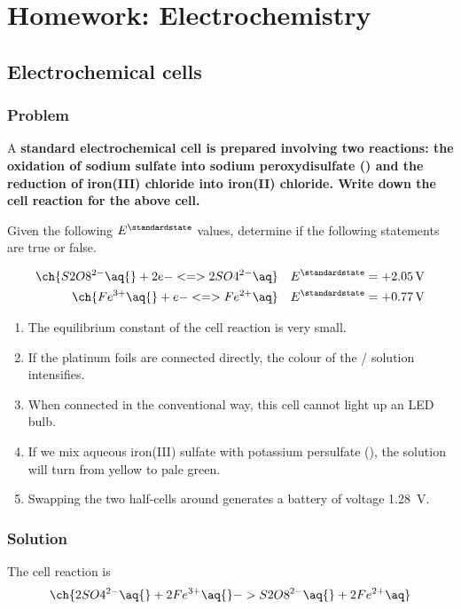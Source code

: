 \section{Homework: Electrochemistry}

\subsection{Electrochemical cells}
\subsubsection{Problem}
A \bf{standard} electrochemical cell is prepared involving two reactions: the
oxidation of sodium sulfate into sodium peroxydisulfate () and the
reduction of iron(III) chloride into iron(II) chloride. Write down the cell
reaction for the above cell.

Given the following \(E^\standardstate\) values, determine if the following
statements are true or false.

\begin{align*}
	\ch{S2O8^{2-} \aq{} + 2 e- <=> 2 SO4^{2-} \aq} & \quad E^\standardstate = +\qty{2.05}{\volt} \\
	\ch{Fe^{3+} \aq{} + e- <=> Fe^{2+} \aq}        & \quad E^\standardstate = +\qty{0.77}{\volt}
\end{align*}

\begin{enumerate}
	\item The equilibrium constant of the cell reaction is very small.
	\item If the platinum foils are connected directly, the colour of the / solution
	      intensifies.
	\item When connected in the conventional way, this cell cannot light up an LED bulb.
	\item If we mix aqueous iron(III) sulfate with potassium persulfate (), the solution will
	      turn from yellow to pale green.
	\item Swapping the two half-cells around generates a battery of voltage \qty{1.28}{\volt}.
\end{enumerate}

\subsubsection{Solution}
The cell reaction  is
\begin{equation*}
	\ch{2 SO4^{2-} \aq{} + 2 Fe^{3+} \aq{} -> S2O8^{2-} \aq{} + 2 Fe^{2+} \aq}
\end{equation*}

